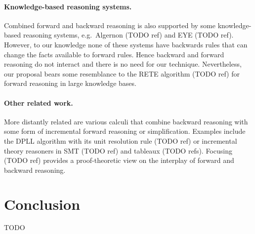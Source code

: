 \documentclass[runningheads]{llncs}
\newcommand{\jcom}[1]{{\color{orange}{Jannis: #1}} }
\begin{document}
\paragraph{Knowledge-based reasoning systems.}
Combined forward and backward reasoning is also supported by some knowledge-based reasoning systems, e.g.\ Algernon (TODO ref) and EYE (TODO ref).
However, to our knowledge none of these systems have backwards rules that can change the facts available to forward rules.
Hence backward and forward reasoning do not interact and there is no need for our technique.
Nevertheless, our proposal bears some resemblance to the RETE algorithm (TODO ref) for forward reasoning in large knowledge bases.

\paragraph{Other related work.}
More distantly related are various calculi that combine backward reasoning with some form of incremental forward reasoning or simplification.
Examples include the DPLL algorithm with its unit resolution rule (TODO ref) or incremental theory reasoners in SMT (TODO ref) and tableaux (TODO refs).
Focusing (TODO ref) provides a proof-theoretic view on the interplay of forward and backward reasoning.

\jcom{auto2}

\section{Conclusion}

TODO
\end{document}
